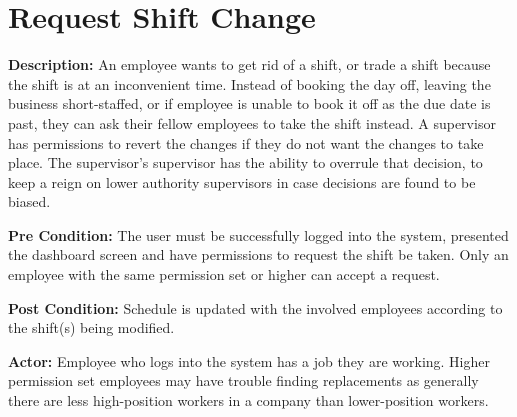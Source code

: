 \documentclass[letterpaper,12pt]{report}
\begin{document}
\section{Request Shift Change}
\begin{description}
 \item \textbf{Description:} \newline An employee wants to get rid of a shift, or trade a shift because the shift is at an inconvenient time. Instead of booking the day off, leaving the business short-staffed, or if employee is unable to book it off as the due date is past, they can ask their fellow employees to take the shift instead. A supervisor has permissions to revert the changes if they do not want the changes to take place. The supervisor’s supervisor has the ability to overrule that decision, to keep a reign on lower authority supervisors in case decisions are found to be biased.
 \item \textbf{Pre Condition:} \newline The user must be successfully logged into the system, presented the dashboard screen and have permissions to request the shift be taken. Only an employee with the same permission set or higher can accept a request. 
 \item \textbf{Post Condition:} \newline Schedule is updated with the involved employees according to the shift(s) being modified.
 \item \textbf{Actor:} \newline Employee who logs into the system has a job they are working. Higher permission set employees may have trouble finding replacements as generally there are less high-position workers in a company than lower-position workers.
\end{description}
\end{document}
